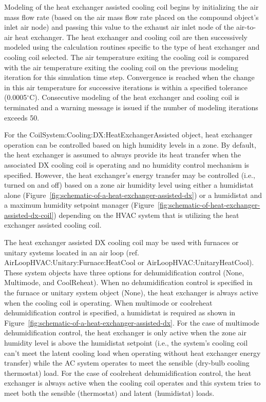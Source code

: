 Modeling of the heat exchanger assisted cooling coil begins by initializing the air mass flow rate (based on the air mass flow rate placed on the compound object's inlet air node) and passing this value to the exhaust air inlet node of the air-to-air heat exchanger. The heat exchanger and cooling coil are then successively modeled using the calculation routines specific to the type of heat exchanger and cooling coil selected. The air temperature exiting the cooling coil is compared with the air temperature exiting the cooling coil on the previous modeling iteration for this simulation time step. Convergence is reached when the change in this air temperature for successive iterations is within a specified tolerance (0.0005\(^{\circ}\)C). Consecutive modeling of the heat exchanger and cooling coil is terminated and a warning message is issued if the number of modeling iterations exceeds 50.

For the CoilSystem:Cooling:DX:HeatExchangerAssisted object, heat exchanger operation can be controlled based on high humidity levels in a zone. By default, the heat exchanger is assumed to always provide its heat transfer when the associated DX cooling coil is operating and no humidity control mechanism is specified. However, the heat exchanger's energy transfer may be controlled (i.e., turned on and off) based on a zone air humidity level using either a humidistat alone (Figure~\ref{fig:schematic-of-a-heat-exchanger-assisted-dx}) or a humidistat and a maximum humidity setpoint manager (Figure~\ref{fig:schematic-of-heat-exchanger-assisted-dx-coil}) depending on the HVAC system that is utilizing the heat exchanger assisted cooling coil.

The heat exchanger assisted DX cooling coil may be used with furnaces or unitary systems located in an air loop (ref. AirLoopHVAC:Unitary:Furnace:HeatCool or AirLoopHVAC:UnitaryHeatCool). These system objects have three options for dehumidification control (None, Multimode, and CoolReheat). When no dehumidification control is specified in the furnace or unitary system object (None), the heat exchanger is always active when the cooling coil is operating. When multimode or coolreheat dehumidification control is specified, a humidistat is required as shown in Figure~\ref{fig:schematic-of-a-heat-exchanger-assisted-dx}. For the case of multimode dehumidification control, the heat exchanger is only active when the zone air humidity level is above the humidistat setpoint (i.e., the system's cooling coil can't meet the latent cooling load when operating without heat exchanger energy transfer) while the AC system operates to meet the sensible (dry-bulb cooling thermostat) load. For the case of coolreheat dehumidification control, the heat exchanger is always active when the cooling coil operates and this system tries to meet both the sensible (thermostat) and latent (humidistat) loads.

